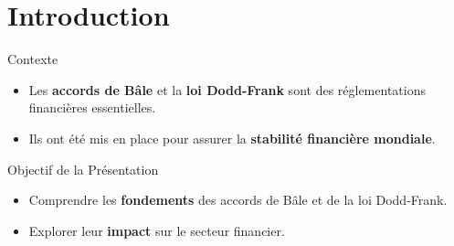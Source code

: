 \section{Introduction}
\begin{frame}{Contexte}
    \begin{itemize}
        \item Les \textbf{accords de Bâle} et la \textbf{loi Dodd-Frank} sont des réglementations financières essentielles.
        \item Ils ont été mis en place pour assurer la \textbf{stabilité financière mondiale}.
    \end{itemize}
\end{frame}

\begin{frame}{Objectif de la Présentation}
    \begin{itemize}
        \item Comprendre les \textbf{fondements} des accords de Bâle et de la loi Dodd-Frank.
        \item Explorer leur \textbf{impact} sur le secteur financier.
    \end{itemize}
\end{frame}
